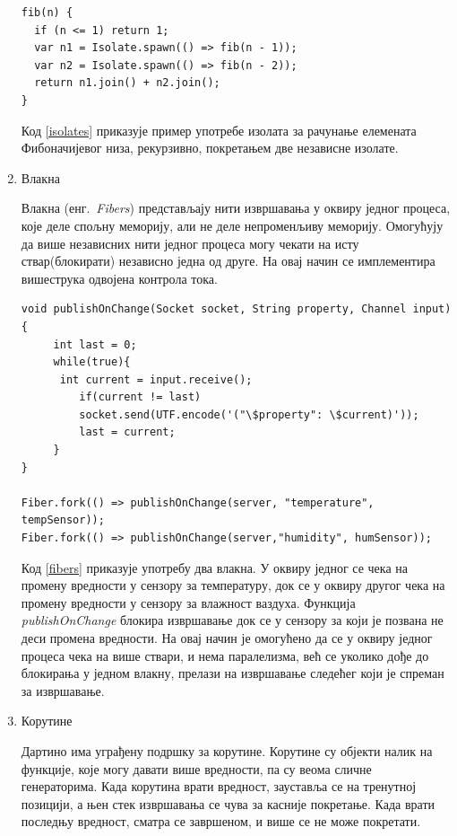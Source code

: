 \documentclass[12pt,oneside]{memoir}
\begin{document}
\begin{enumerate}
\begin{verbatim}
fib(n) {
  if (n <= 1) return 1;
  var n1 = Isolate.spawn(() => fib(n - 1));
  var n2 = Isolate.spawn(() => fib(n - 2));
  return n1.join() + n2.join();
}
\end{verbatim}

Код \ref{isolates} приказује пример употребе изолата за рачунање елемената Фибоначијевог низа, рекурзивно, покретањем две независне изолате.

\item Влакна

Влакна (енг.~\textit{Fibers}) представљају нити извршавања у оквиру једног процеса, које деле спољну меморију, али не деле непроменљиву меморију. Омогућују да више независних нити једног процеса могу чекати на исту ствар(блокирати) независно једна од друге. На овај начин се имплементира вишеструка одвојена контрола тока.

\begin{verbatim}
void publishOnChange(Socket socket, String property, Channel input){
  	 int last = 0;
  	 while(true){
   	  int current = input.receive();
    	 if(current != last)
      	 socket.send(UTF.encode('("\$property": \$current)'));
    	 last = current;
  	 }
}

Fiber.fork(() => publishOnChange(server, "temperature", tempSensor));
Fiber.fork(() => publishOnChange(server,"humidity", humSensor));
\end{verbatim}

Код \ref{fibers} приказује употребу два влакна. У оквиру једног се чека на промену вредности у сензору за температуру, док се у оквиру другог чека на промену вредности у сензору за влажност ваздуха. Функција \textit{publishOnChange} блокира извршавање док се у сензору за који је позвана не деси промена вредности. На овај начин је омогућено да се у оквиру једног процеса чека на више ствари, и нема паралелизма, већ се уколико дође до блокирања у једном влакну, прелази на извршавање следећег који је спреман за извршавање.

\item Корутине

Дартино има уграђену подршку за корутине. Корутине су објекти налик на функције, које могу давати више вредности, па су веома сличне генераторима. Када корутина врати вредност, зауставља се на тренутној позицији, а њен стек извршавања се чува за касније покретање. Када врати последњу вредност, сматра се завршеном, и више се не може покретати.


\end{enumerate}
\end{document}
